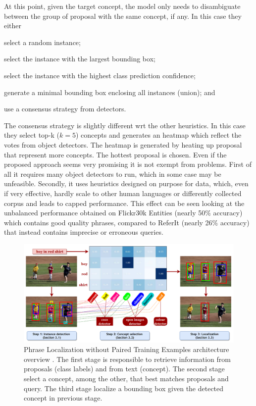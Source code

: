 At this point, given the target concept, the model only needs to
disambiguate between the group of proposal with the same concept, if
any. In this case they either
\begin{enumerate*}[label=(\roman*)] 
  \item select a random instance;
  \item select the instance with the largest bounding box; 
  \item select the instance with the highest class prediction
  confidence;
  \item generate a minimal bounding box enclosing all instances
  (union); and
  \item use a consensus strategy from detectors.
\end{enumerate*} 
The consensus strategy is slightly different wrt the other heuristics.
In this case they select top-k ($k = 5$) concepts and generates an
heatmap which reflect the votes from object detectors. The heatmap is
generated by heating up proposal that represent more concepts. The
hottest proposal is chosen. Even if the proposed approach seems very
promising it is not exempt from problems. First of all it requires
many object detectors to run, which in some case may be unfeasible.
Secondly, it uses heuristics designed on purpose for data, which, even
if very effective, hardly scale to other human languages or
differently collected corpus and leads to capped performance. This
effect can be seen looking at the unbalanced performance obtained on
Flickr30k Entities (nearly 50\% accuracy) which contains good quality
phrases, compared to ReferIt (nearly 26\% accuracy) that instead
contains imprecise or erroneous queries.

\begin{figure}
  \centering
  \includegraphics[width=.8\textwidth]{figures/phraseloc-model.png}
  \caption[Phrase Localization without Paired Training Examples
  architecture overview]{Phrase Localization without Paired Training
  Examples architecture overview \cite{wang2019phrase}. The first
  stage is responsible to retrieve information from proposals (class
  labels) and from text (concept). The second stage select a concept,
  among the other, that best matches proposals and query. The third
  stage localize a bounding box given the detected concept in previous
  stage.}
  \label{fig:phraseloc-model}
\end{figure}

